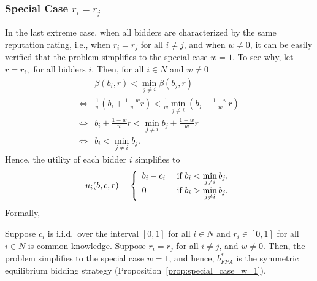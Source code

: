\subsubsection{Special Case $r_i=r_j$} %
\label{sub:special_case_r_i_r_j_}
In the last extreme case, when all bidders are characterized by the same reputation rating, i.e., when $r_i = r_j$ for all $i\neq j$, and when $w\neq 0$, it can be easily verified that the problem simplifies to the special case $w=1$. To see why, let $r = r_i,$ for all bidders $i$. Then, for all $i\in N$ and $w\neq 0$
\begin{align*}
	&\beta(b_i, r) < \min_{j\neq i} \beta(b_j, r)\\
	\iff &\frac{1}{w} \left(b_i + \frac{1-w}{w} r\right) < \frac{1}{w} \min_{j\neq i} \left(b_j + \frac{1-w}{w} r\right)\\
	\iff &b_i + \frac{1-w}{w} r < \min_{j\neq i} b_j + \frac{1-w}{w} r\\
	\iff &b_i < \min_{j\neq i} b_j.
\end{align*}
Hence, the utility of each bidder $i$ simplifies to
\begin{equation*}
	u_i(b,c,r) = \left\{
	\begin{array}{l l}
		b_i - c_i &\text{ if } b_i < \displaystyle\min_{j\neq i} b_j,\\
		0 &\text{ if } b_i > \displaystyle\min_{j\neq i} b_j.
	\end{array}
	\right.
\end{equation*}
Formally,
\begin{corollary}
\label{cor:special_case_r_i_r_j_}
Suppose $c_i$ is i.i.d.~over the interval $[0,1]$ for all $i\in N$ and $r_i\in [0,1]$ for all $i\in N$ is common knowledge. Suppose $r_i = r_j$ for all $i\neq j$, and $w\neq 0$. Then, the problem simplifies to the special case $w=1$, and hence, $b^*_{FPA}$ is the symmetric equilibrium bidding strategy (Proposition~\ref{prop:special_case_w_1}).
\end{corollary}

